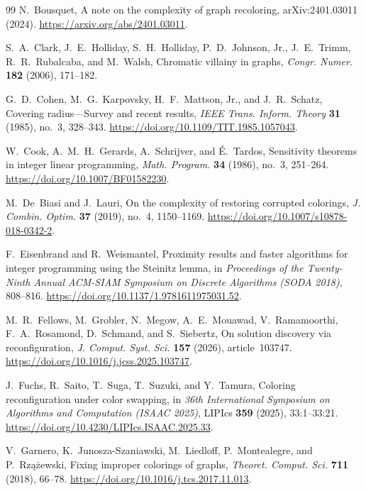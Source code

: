\documentclass[10pt,a4paper]{amsart}
\numberwithin{equation}{section}
\theoremstyle{definition}
\theoremstyle{remark}
\begin{document}
\begin{thebibliography}{99}
N.~Bousquet,
A note on the complexity of graph recoloring,
arXiv:2401.03011 (2024).
\url{https://arxiv.org/abs/2401.03011}.

S.~A.~Clark, J.~E.~Holliday, S.~H.~Holliday, P.~D.~Johnson, Jr.,
J.~E.~Trimm, R.~R.~Rubalcaba, and M.~Walsh,
Chromatic villainy in graphs,
\emph{Congr. Numer.} \textbf{182} (2006), 171--182.

G.~D.~Cohen, M.~G.~Karpovsky, H.~F.~Mattson, Jr., and J.~R.~Schatz,
Covering radius---Survey and recent results,
\emph{IEEE Trans. Inform. Theory} \textbf{31} (1985), no.~3, 328--343.
\url{https://doi.org/10.1109/TIT.1985.1057043}.

W.~Cook, A.~M.~H.~Gerards, A.~Schrijver, and \'E.~Tardos,
Sensitivity theorems in integer linear programming,
\emph{Math. Program.} \textbf{34} (1986), no.~3, 251--264.
\url{https://doi.org/10.1007/BF01582230}.

M.~De~Biasi and J.~Lauri,
On the complexity of restoring corrupted colorings,
\emph{J. Combin. Optim.} \textbf{37} (2019), no.~4, 1150--1169.
\url{https://doi.org/10.1007/s10878-018-0342-2}.

F.~Eisenbrand and R.~Weismantel,
Proximity results and faster algorithms for integer programming using
the Steinitz lemma,
in \emph{Proceedings of the Twenty-Ninth Annual ACM-SIAM Symposium on
Discrete Algorithms (SODA 2018)}, 808--816.
\url{https://doi.org/10.1137/1.9781611975031.52}.

M.~R.~Fellows, M.~Grobler, N.~Megow, A.~E.~Mouawad,
V.~Ramamoorthi, F.~A.~Rosamond, D.~Schmand, and S.~Siebertz,
On solution discovery via reconfiguration,
\emph{J. Comput. Syst. Sci.} \textbf{157} (2026), article~103747.
\url{https://doi.org/10.1016/j.jcss.2025.103747}.

J.~Fuchs, R.~Saito, T.~Suga, T.~Suzuki, and Y.~Tamura,
Coloring reconfiguration under color swapping,
in \emph{36th International Symposium on Algorithms and Computation
(ISAAC 2025)}, LIPIcs \textbf{359} (2025), 33:1--33:21.
\url{https://doi.org/10.4230/LIPIcs.ISAAC.2025.33}.

V.~Garnero, K.~Junosza-Szaniawski, M.~Liedloff, P.~Montealegre,
and P.~Rz\k{a}\.{z}ewski,
Fixing improper colorings of graphs,
\emph{Theoret. Comput. Sci.} \textbf{711} (2018), 66--78.
\url{https://doi.org/10.1016/j.tcs.2017.11.013}.


\end{thebibliography}
\end{document}

